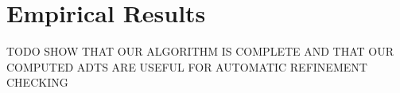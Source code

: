 \section{Empirical Results}
\label{sec:empirical}

TODO SHOW THAT OUR ALGORITHM IS COMPLETE AND THAT OUR COMPUTED ADTS ARE USEFUL
FOR AUTOMATIC REFINEMENT CHECKING
